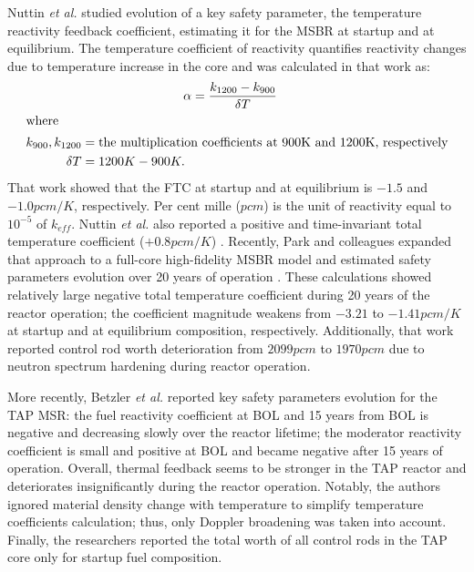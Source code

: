 Nuttin \emph{et al.} studied evolution of a key safety parameter, the 
temperature 
reactivity feedback coefficient, estimating it for the \gls{MSBR} at startup 
and at equilibrium. The temperature coefficient of reactivity quantifies 
reactivity changes due to temperature increase in the core and was calculated 
in that 
work as:
\begin{align}\label{eq:feedback}
	& \qquad\qquad\qquad\quad\quad \alpha = \frac{k_{1200} - k_{900}}{\delta 
	T} \\
	\intertext{where}
	k_{900}, k_{1200}  &= \mbox{the multiplication 
	coefficients at 900K and 
		1200K, respectively} 
	\nonumber \\
	\delta T &= 1200K-900K.\nonumber
\end{align}
That work showed that the \gls{FTC} at startup and at equilibrium is $-1.5$ 
and $-1.0pcm/K$, respectively. Per cent mille ($pcm$) is the unit of 
reactivity equal to $10^{-5}$ of $k_{eff}$. Nuttin \emph{et al.} also reported 
a positive and time-invariant total temperature coefficient ($+0.8pcm/K$) 
\cite{nuttin_potential_2005}. Recently, Park and colleagues expanded that 
approach to a full-core high-fidelity \gls{MSBR} model and estimated safety 
parameters evolution over 20 years of operation \cite{park_whole_2015}. These 
calculations showed relatively large negative total temperature coefficient 
during 20 years of the reactor operation; the coefficient magnitude weakens 
from $-3.21$ to $-1.41pcm/K$ at startup and at equilibrium composition, 
respectively. Additionally, that work reported control rod worth deterioration 
from $2099pcm$ to $1970pcm$ due to neutron spectrum hardening during reactor 
operation. 

More recently, Betzler \emph{et al.} \cite{betzler_assessment_2017-1} reported 
key safety parameters evolution for the \gls{TAP} \gls{MSR}: the fuel 
reactivity coefficient at \gls{BOL} and 15 years from \gls{BOL} is negative 
and decreasing slowly over the reactor lifetime; the moderator reactivity 
coefficient is small and positive at \gls{BOL} and became negative after 15 
years of operation. Overall, thermal feedback seems to be stronger in the 
\gls{TAP} reactor and deteriorates insignificantly during the reactor 
operation. Notably, the authors ignored material density change with 
temperature to simplify temperature coefficients calculation; thus, only  
Doppler broadening was taken into account. Finally, the researchers reported 
the total worth of all control rods in the \gls{TAP} core only for startup 
fuel composition. 

